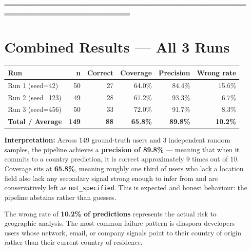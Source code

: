 \documentclass[11pt,a4paper]{article}
\begin{document}
════════════════════════════════════════════════════════════════════════════
\section{Combined Results — All 3 Runs}

\begin{tabular}{lrrrrr}
\toprule
\textbf{Run} & \textbf{n} & \textbf{Correct} & \textbf{Coverage} & \textbf{Precision} & \textbf{Wrong rate} \\
\midrule
Run 1 (seed=42)  & 50 & 27 & 64.0\% & 84.4\% & 15.6\% \\
Run 2 (seed=123) & 49 & 28 & 61.2\% & 93.3\% &  6.7\% \\
Run 3 (seed=456) & 50 & 33 & 72.0\% & 91.7\% &  8.3\% \\
\midrule
\textbf{Total / Average} & \textbf{149} & \textbf{88} & \textbf{65.8\%} & \textbf{89.8\%} & \textbf{10.2\%} \\
\bottomrule
\end{tabular}

\vspace{8pt}
\noindent\textbf{Interpretation:} Across 149 ground-truth users and 3 independent random samples,
the pipeline achieves a \textbf{precision of 89.8\%} --- meaning that when it commits to a country
prediction, it is correct approximately 9 times out of 10. Coverage sits at \textbf{65.8\%},
meaning roughly one third of users who lack a location field also lack any secondary signal strong
enough to infer from and are conservatively left as \texttt{not\_specified}. This is expected and
honest behaviour: the pipeline abstains rather than guesses.

The wrong rate of \textbf{10.2\% of predictions} represents the actual risk to geographic analysis.
The most common failure pattern is diaspora developers --- users whose network, email, or company
signals point to their country of origin rather than their current country of residence.
\end{document}
